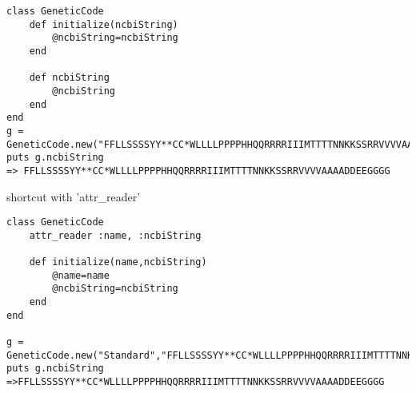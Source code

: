 \documentclass{article}
\begin{document}
\begin{lstlisting}
class GeneticCode
	def initialize(ncbiString)
		@ncbiString=ncbiString
	end
	
	def ncbiString
		@ncbiString
	end 
end
g = GeneticCode.new("FFLLSSSSYY**CC*WLLLLPPPPHHQQRRRRIIIMTTTTNNKKSSRRVVVVAAAADDEEGGGG")
puts g.ncbiString
=> FFLLSSSSYY**CC*WLLLLPPPPHHQQRRRRIIIMTTTTNNKKSSRRVVVVAAAADDEEGGGG
\end{lstlisting}

shortcut with 'attr\_reader'
\begin{lstlisting}
class GeneticCode
	attr_reader :name, :ncbiString

	def initialize(name,ncbiString)
		@name=name
		@ncbiString=ncbiString
	end
end

g = GeneticCode.new("Standard","FFLLSSSSYY**CC*WLLLLPPPPHHQQRRRRIIIMTTTTNNKKSSRRVVVVAAAADDEEGGGG")
puts g.ncbiString
=>FFLLSSSSYY**CC*WLLLLPPPPHHQQRRRRIIIMTTTTNNKKSSRRVVVVAAAADDEEGGGG
\end{lstlisting}
\end{document}
